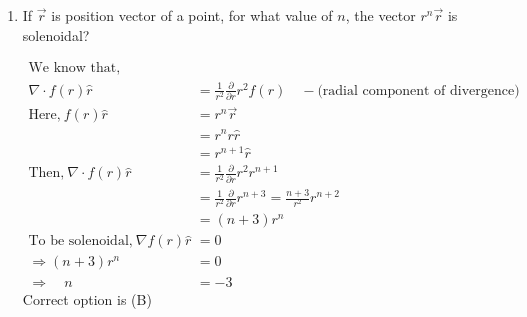 \begin{enumerate}[label=\color{ocre}\textbf{\arabic*.}]
\begin{answer}
	\begin{align*}
	\intertext{The equations of two surfaces are,}
	f(x, y, z)&=2 \text { and } g(x, y, z)=0\\
	\text{where} f(x . y, z)&=y^{2}+z^{2} \ \text{and}\quad g(x, y, z)=y^{2}-x^{2}
	\intertext{The normal to the first surfaces is}
	\overrightarrow{\nabla f}&=\frac{\partial f}{\partial x} \hat{i}+\frac{\partial f}{\partial y} \hat{j}+\frac{\partial f}{\partial z} \hat{k} \Rightarrow \overrightarrow{\nabla f}=2 y \hat{j}+2 z \hat{k} \\
	\overrightarrow{\nabla g}&=\frac{\partial g}{\partial x} \hat{i}+\frac{\partial g}{\partial y}+\hat{j}+\frac{\partial g}{\partial z} \hat{k} \Rightarrow \overrightarrow{\nabla g}=-2 x \hat{i}+2 y \hat{j}\\
	\text{At point} (1,-1,1), \overrightarrow{\nabla f}&=-2 \hat{j}+2 \hat{k} \ \text{and}\quad \overrightarrow{\nabla g}=-2 \hat{i}-2\hat{j}
	\intertext{Hence the angle between the two surfaces is}
	\theta&=\cos ^{-1} \frac{\vec{\nabla} \vec{f} \cdot \overrightarrow{\nabla g}}{|\overrightarrow{\nabla f}||\overrightarrow{\nabla g}|}\\&=\cos ^{-1} \frac{(-2 \hat{j}+2 \hat{k}) \cdot(-2 \hat{i}-2 \hat{j})}{\sqrt{8} \sqrt{8}}\\
	\text{Or}\quad  \theta&=\cos ^{-1} \frac{4}{8}\\&=\cos ^{-1 }\frac{1}{2} \\&=60^{\circ}
	\end{align*}
	Correct option is (C)
\end{answer}

\item If $\vec{r}$ is position vector of a point, for what value of $n$, the vector $r^{n} \vec{r}$ is solenoidal?  


\begin{answer}
\begin{align*}
\text{We know that,}\\
\nabla \cdot f(r) \hat{r}&=\frac{1}{r^{2}} \frac{\partial}{\partial r} r^{2} f(r)\quad- \text{(radial component of divergence)}\\
\text{Here,}\ f(r) \hat{r}&=r^{n} \vec{r}\\
&=r^{n} r \hat{r}\\
&=r^{n+1} \hat{r}\\
\text{Then,}\ \nabla \cdot f(r) \hat{r}&=\frac{1}{r^{2}} \frac{\partial}{\partial r} r^{2} r^{n+1}\\
&=\frac{1}{r^{2}} \frac{\partial}{\partial r} r^{n+3}=\frac{n+3}{r^{2}} r^{n+2}\\
&=(n+3) r^{n}\\
\text{To be solenoidal,}\ \nabla f(r) \hat{r}&=0\\
\Rightarrow(n+3) r^{n}&=0\\
\Rightarrow \quad n&=-3
\end{align*}
Correct option is (B)
\end{answer}



\end{enumerate}
